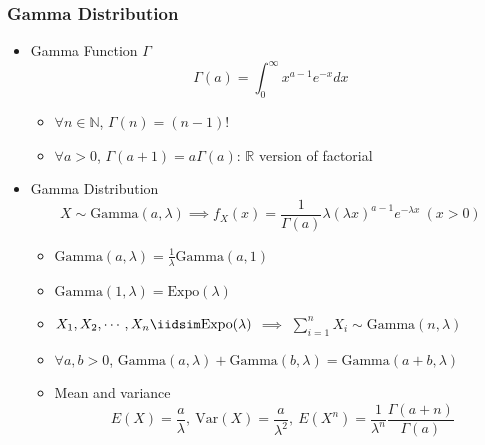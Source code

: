 \subsubsection*{Gamma Distribution}
\begin{itemize}
    \item Gamma Function $\Gamma$
    \begin{equation}
        \Gamma(a)=\int_0^\infty x^{a-1}e^{-x}dx
    \end{equation}
    \begin{itemize}
        \item $\forall n\in\mathbb{N}$, $\Gamma(n)=(n-1)!$
        \item $\forall a>0$, $\Gamma(a+1)=a\Gamma(a)$: $\mathbb{R}$ version of factorial
    \end{itemize}
    \item Gamma Distribution
    \begin{equation}
        X\sim\text{Gamma}(a,\lambda)\implies f_X(x)=\frac{1}{\Gamma(a)}\lambda (\lambda x)^{a-1}e^{-\lambda x}~(x>0)
    \end{equation}
    \begin{itemize}
        \item $\text{Gamma}(a,\lambda)=\frac{1}{\lambda}\text{Gamma}(a,1)$
        \item $\text{Gamma}(1,\lambda)=\text{Expo}(\lambda)$
        \item $X_1,X_2,\cdots,X_n\iidsim\text{Expo}(\lambda)$ $\implies$ $\sum_{i=1}^nX_i\sim\text{Gamma}(n,\lambda)$
        \item $\forall a,b>0$, $\text{Gamma}(a,\lambda)+\text{Gamma}(b,\lambda)=\text{Gamma}(a+b,\lambda)$
        \item Mean and variance
        \begin{equation}
            E(X)=\frac{a}{\lambda},~\text{Var}(X)=\frac{a}{\lambda^2},~E(X^n)=\frac{1}{\lambda^n}\frac{\Gamma(a+n)}{\Gamma(a)}
        \end{equation}
    \end{itemize}
\end{itemize}
\begin{figures}
\end{figures}

